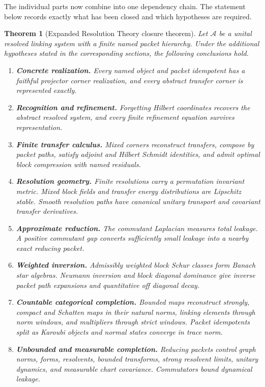 \documentclass{aomart}
\newtheorem{theorem}{Theorem}[section]
\theoremstyle{definition}
\theoremstyle{remark}
\newcommand{\Acal}{\mathcal A}
\begin{document}
The individual parts now combine into one dependency chain. The statement below records exactly what has been closed and which hypotheses are required.

\begin{theorem}[Expanded Resolution Theory closure theorem]\label{thm:closure}
Let \(\Acal\) be a unital resolved linking system with a finite named packet hierarchy. Under the additional hypotheses stated in the corresponding sections, the following conclusions hold.
\begin{enumerate}
\item \textbf{Concrete realization.} Every named object and packet idempotent has a faithful projector corner realization, and every abstract transfer corner is represented exactly.
\item \textbf{Recognition and refinement.} Forgetting Hilbert coordinates recovers the abstract resolved system, and every finite refinement equation survives representation.
\item \textbf{Finite transfer calculus.} Mixed corners reconstruct transfers, compose by packet paths, satisfy adjoint and Hilbert Schmidt identities, and admit optimal block compression with named residuals.
\item \textbf{Resolution geometry.} Finite resolutions carry a permutation invariant metric. Mixed block fields and transfer energy distributions are Lipschitz stable. Smooth resolution paths have canonical unitary transport and covariant transfer derivatives.
\item \textbf{Approximate reduction.} The commutant Laplacian measures total leakage. A positive commutant gap converts sufficiently small leakage into a nearby exact reducing packet.
\item \textbf{Weighted inversion.} Admissibly weighted block Schur classes form Banach star algebras. Neumann inversion and block diagonal dominance give inverse packet path expansions and quantitative off diagonal decay.
\item \textbf{Countable categorical completion.} Bounded maps reconstruct strongly, compact and Schatten maps in their natural norms, linking elements through norm windows, and multipliers through strict windows. Packet idempotents split as Karoubi objects and normal states converge in trace norm.
\item \textbf{Unbounded and measurable completion.} Reducing packets control graph norms, forms, resolvents, bounded transforms, strong resolvent limits, unitary dynamics, and measurable chart covariance. Commutators bound dynamical leakage.

\end{enumerate}
\end{theorem}
\end{document}

